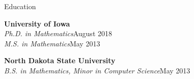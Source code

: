 \documentclass[hidelinks]{resume} %
\begin{document}
\begin{rSection}{Education}

{\bf University of Iowa}\\
{\em Ph.D. in Mathematics}\hfill August 2018\\
{\em M.S. in Mathematics}\hfill May 2013%

{\bf North Dakota State University}\\
{\em B.S. in Mathematics, Minor in Computer Science}\hfill May 2013\\



\end{rSection}









\end{document}
